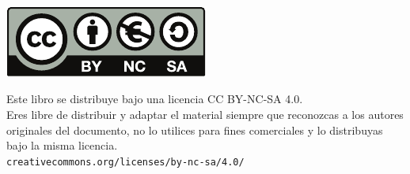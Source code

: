 \documentclass[fontsize=12pt]{scrartcl}
\begin{document}

\begin{titlepage}
	\noindent
	\setlength\fboxsep{0cm}
	\parbox[t]{\textwidth}{
			\raggedright
			\fontsize{50pt}{50pt}\selectfont\sffamily\color{white}{
			  \textbf{\asignatura}
      }
	}

	\vfill

	\noindent
	\parbox[b]{\textwidth}{
		\raggedright
		\sffamily\large\color{white}
		{\Large \autor }\\[4pt]
		\grado\\
		\universidad\\[4pt]
		\texttt{\enlaceweb}
	}

\end{titlepage}
\restorepagecolor


\thispagestyle{empty}
\null
\vfill

\noindent
\parbox[b]{0.7\textwidth}{
  \includegraphics{by-nc-sa.pdf}\\[4pt]
  \raggedright
  \sffamily
  {\large Este libro se distribuye bajo una licencia CC BY-NC-SA 4.0.}\\[4pt]
  Eres libre de distribuir y adaptar el material siempre que reconozcas a los autores originales del documento, no lo utilices para fines comerciales y lo distribuyas bajo la misma licencia.\\[4pt]
  \texttt{creativecommons.org/licenses/by-nc-sa/4.0/}
}


\begin{titlepage}

	\noindent
	\parbox[t]{\textwidth}{
			\raggedright
			\fontsize{50pt}{50pt}\selectfont\sffamily\color{500}{
			  \textbf{\asignatura}
      }
	}

	\vfill

	\noindent
	\parbox[b]{\textwidth}{
		\raggedright
		\sffamily\large
		{\Large \autor}\\[4pt]
		\grado\\
		\universidad\\[4pt]
		\texttt{\enlaceweb}
	}

\end{titlepage}
\end{document}
